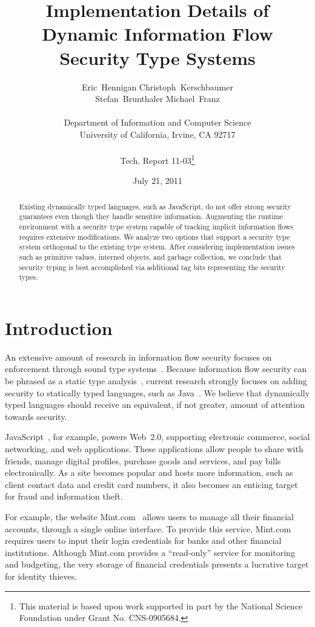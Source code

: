 \documentclass[11pt,onecolumn]{article}
\title{Implementation Details of Dynamic Information Flow Security Type Systems}
\author{Eric~Hennigan \hspace{12pt} Christoph~Kerschbaumer \\ Stefan~Brunthaler \hspace{12pt} Michael~Franz\\
\\
Department of Information and Computer Science\\
University of California, Irvine, CA 92717\\
\\
Tech. Report 11-03\footnote{This material is based upon work supported in part by the National Science Foundation under Grant No. CNS-0905684.}
}
\begin{document}
\date{July 21, 2011}

\maketitle

\begin{abstract}
Existing dynamically typed languages, such as JavaScript, do not offer strong security guarantees even though they handle sensitive information.
Augmenting the runtime environment with a security type system capable of tracking implicit information flows requires extensive modifications.
We analyze two options that support a security type system orthogonal to the existing type system.
After considering implementation issues such as primitive values, interned objects, and garbage collection, we conclude that security typing is best accomplished via additional tag bits representing the security types.
\end{abstract}

\thispagestyle{empty}
\newpage
\setcounter{page}{1}

\section{Introduction}

An extensive amount of research in information flow security focuses on enforcement through sound type systems~\cite{1159651}.
Because information flow security can be phrased as a static type analysis~\cite{volpano1996sound}, current research strongly focuses on adding security to statically typed languages, such as Java~\cite{myers2001jif}.
We believe that dynamically typed languages should receive an equivalent, if not greater, amount of attention towards security.

JavaScript~\cite{ecma}, for example, powers Web~2.0, supporting electronic commerce, social networking, and web applications.
These applications allow people to share with friends, manage digital profiles, purchase goods and services, and pay bills electronically.
As a site becomes popular and hosts more information, such as client contact data and credit card numbers, it also becomes an enticing target for fraud and information theft.

For example, the website Mint.com~\cite{mint.com} allows users to manage all their financial accounts, through a single online interface.
To provide this service, Mint.com requires users to input their login credentials for banks and other financial institutions.
Although Mint.com provides a ``read-only'' service for monitoring and budgeting, the very storage of financial credentials presents a lucrative target for identity thieves.
\end{document}
